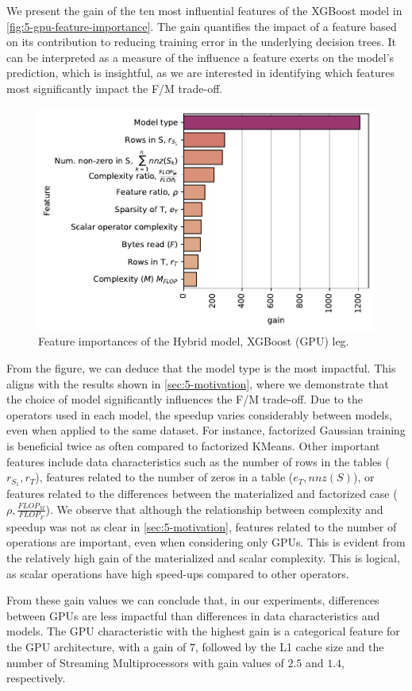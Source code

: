 We present the gain of the ten most influential features of the XGBoost model in \autoref{fig:5-gpu-feature-importance}. The gain quantifies the impact of a feature based on its contribution to reducing training error in the underlying decision trees. It can be interpreted as a measure of the influence a feature exerts on the model's prediction, which is insightful, as we are interested in identifying which features most significantly impact the F/M trade-off.
\begin{figure}[ht]
    \centering
    \includegraphics[width=0.75\linewidth]{chapters/05_cost_estimation/figures/xgboost-feat-importance.pdf}
    \caption[Feature importances of the hybrid model]{Feature importances of the Hybrid model, XGBoost (GPU) leg.}
    \label{fig:5-gpu-feature-importance}
\end{figure}

From the figure, we can deduce that the model type is the most impactful. This aligns with the results shown in \autoref{sec:5-motivation}, where we demonstrate that the choice of model significantly influences the F/M trade-off. Due to the operators used in each model, the speedup varies considerably between models, even when applied to the same dataset. For instance, factorized Gaussian training is beneficial twice as often compared to factorized KMeans. Other important features include data characteristics such as the number of rows in the tables ($r_{S_1}, r_T$), features related to the number of zeros in a table ($e_T, nnz(S)$), or features related to the differences between the materialized and factorized case ($\rho, \frac{FLOP_M}{FLOP_F}$). We observe that although the relationship between complexity and speedup was not as clear in \autoref{sec:5-motivation}, features related to the number of operations are important, even when considering only GPUs. This is evident from the relatively high gain of the materialized and scalar complexity. This is logical, as scalar operations have high speed-ups compared to other operators.

From these gain values we can conclude that, in our experiments, differences between GPUs are less impactful than differences in data characteristics and models. The GPU characteristic with the highest gain is a categorical feature for the GPU architecture, with a gain of $7$, followed by the L1 cache size and the number of Streaming Multiprocessors with gain values of $2.5$ and $1.4$, respectively.


